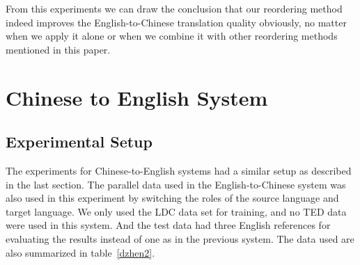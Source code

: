 %

From this experiments we can draw the conclusion that our reordering method indeed improves the English-to-Chinese translation quality obviously, no matter when we apply it alone or when we combine it with other reordering methods mentioned in this paper. %

\section{Chinese to English System}
\label{ch:Evaluation:sec:zhen2}


\subsection{Experimental Setup}

The experiments for Chinese-to-English systems had a similar setup as described in the last section. The parallel data used in the English-to-Chinese system was also used in this experiment by switching the roles of the source language and target language. We only used the LDC data set for training, and no TED data were used in this system. And the test data had three English references for evaluating the results instead of one as in the previous system. The data used are also summarized in table~\ref{dzhen2}.



